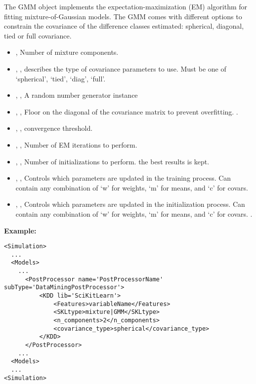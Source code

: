The GMM object implements the expectation-maximization (EM)
algorithm for fitting mixture-of-Gaussian models. The GMM comes with different options
 to constrain the covariance of  the difference classes estimated: spherical, diagonal, tied or
 full covariance.

\begin{itemize}
	\item {},  Number of mixture components. 
	\item {}, , describes the type of covariance parameters to use.
Must be one of ‘spherical’, ‘tied’, ‘diag’, ‘full’. 
	\item {}, ,  A random number
generator instance 
	\item {}, ,
 Floor on the diagonal of the covariance matrix to prevent overfitting.
 .
	\item {}, ,
convergence threshold. 
	\item {}, ,
Number of EM iterations to perform. 
	\item {}, ,
Number of initializations to perform. the best results is kept.
	\item {}, ,
 Controls which parameters are updated in the training process.
Can contain any combination of ‘w’ for weights, ‘m’ for means, and
‘c’ for covars. 
	\item {}, , Controls which parameters are updated in the initialization
process. Can contain any combination of ‘w’ for weights, ‘m’ for means,
 and ‘c’ for covars. .
\end{itemize}

\textbf{Example:}
\begin{lstlisting}[style=XML,morekeywords={subType}]
<Simulation>
  ...
  <Models>
    ...
      <PostProcessor name='PostProcessorName' subType='DataMiningPostProcessor'>
          <KDD lib='SciKitLearn'>
              <Features>variableName</Features>
              <SKLtype>mixture|GMM</SKLtype>
              <n_components>2</n_components>
              <covariance_type>spherical</covariance_type>
          </KDD>
      </PostProcessor>
    ...
  <Models>
  ...
<Simulation>
\end{lstlisting}


